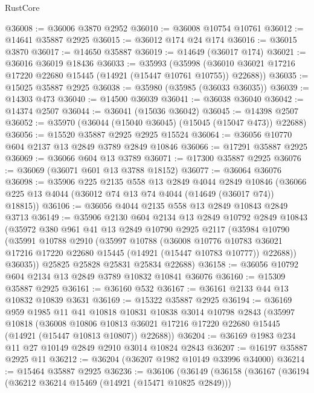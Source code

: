 \begin{lexlean}{RustCore}
\begin{coremodule}
@36008 := @36006 @3870 @2952
@36010 := @36008 @10754 @10761
@36012 := @14641 @35887 @2925
@36015 := @36012 @174 @24 @174
@36016 := @36015 @3870
@36017 := @14650 @35887
@36019 := @14649 (@36017 @174)
@36021 := @36016 @36019 @18436
@36033 := @35993
    (@35998 (@36010 @36021 @17216 @17220 @22680 @15445 (@14921 (@15447 @10761 @10755)) @22688))
@36035 := @15025 @35887 @2925
@36038 := @35980 (@35985 (@36033 @36035))
@36039 := @14303 @473
@36040 := @14500 @36039
@36041 := @36038 @36040
@36042 := @14374 @2507
@36044 := @36041 (@15036 @36042)
@36045 := @14398 @2507
@36052 := @35970 (@36044 (@15040 @36045) (@15045 (@15047 @473)) @22688)
@36056 := @15520 @35887 @2925 @2925 @15524
@36064 := @36056 @10770 @604 @2137 @13 @2849 @3789 @2849 @10846
@36066 := @17291 @35887 @2925
@36069 := @36066 @604 @13 @3789
@36071 := @17300 @35887 @2925
@36076 := @36069 (@36071 @601 @13 @3788 @18152)
@36077 := @36064 @36076
@36098 := @35906
    @225
    @2135
    @558
    @13
    @2849
    @4044
    @2849
    @10846
    (@36066 @225 @13 @4044 (@36012 @74 @13 @74 @4044 (@14649 (@36017 @74)) @18815))
@36106 := @36056 @4044 @2135 @558 @13 @2849 @10843 @2849 @3713
@36149 := @35906
    @2130
    @604
    @2134
    @13
    @2849
    @10792
    @2849
    @10843
    (@35972
      @380
      @961
      @41
      @13
      @2849
      @10790
      @2925
      @2117
      (@35984
        @10790
        (@35991
          @10788
          @2910
          (@35997
            @10788
            (@36008
              @10776
              @10783
              @36021
              @17216
              @17220
              @22680
              @15445
              (@14921 (@15447 @10783 @10777))
              @22688))
          @36035))
      @25825
      @25828
      @25831
      @25834
      @22688)
@36158 := @36056 @10792 @604 @2134 @13 @2849 @3789 @10832 @10841 @36076
@36160 := @15309 @35887 @2925
@36161 := @36160 @532
@36167 := @36161 @2133 @44 @13 @10832 @10839 @3631
@36169 := @15322 @35887 @2925
@36194 := @36169
    @959
    @1985
    @11
    @41
    @10818
    @10831
    @10838
    @3014
    @10798
    @2843
    (@35997
      @10818
      (@36008
        @10806
        @10813
        @36021
        @17216
        @17220
        @22680
        @15445
        (@14921 (@15447 @10813 @10807))
        @22688))
@36204 := @36169 @1983 @234 @11 @27 @10149 @2849 @2910 @3014 @10824 @2843
@36207 := @16197 @35887 @2925 @11
@36212 := @36204 (@36207 @1982 @10149 @33996 @34000)
@36214 := @15464 @35887 @2925
@36236 := @36106
    (@36149
      (@36158
        (@36167
          (@36194
            (@36212 @36214 @15469 (@14921 (@15471 @10825 @2849)))

\end{coremodule}
\end{lexlean}
